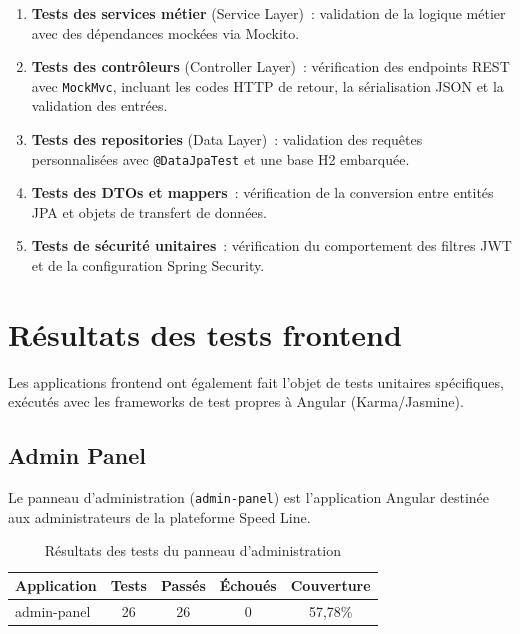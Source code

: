 \begin{enumerate}[leftmargin=*]
  \item \textbf{Tests des services m\'{e}tier} (Service Layer)~: validation de
    la logique m\'{e}tier avec des d\'{e}pendances mock\'{e}es via Mockito.
  \item \textbf{Tests des contr\^{o}leurs} (Controller Layer)~: v\'{e}rification
    des endpoints REST avec \texttt{MockMvc}, incluant les codes HTTP de
    retour, la s\'{e}rialisation JSON et la validation des entr\'{e}es.
  \item \textbf{Tests des repositories} (Data Layer)~: validation des
    requ\^{e}tes personnalis\'{e}es avec \texttt{@DataJpaTest} et une base H2
    embarqu\'{e}e.
  \item \textbf{Tests des DTOs et mappers}~: v\'{e}rification de la conversion
    entre entit\'{e}s JPA et objets de transfert de donn\'{e}es.
  \item \textbf{Tests de s\'{e}curit\'{e} unitaires}~: v\'{e}rification du
    comportement des filtres JWT et de la configuration Spring Security.
\end{enumerate}

\section{R\'{e}sultats des tests frontend}
\label{sec:resultats-frontend}

Les applications frontend ont \'{e}galement fait l'objet de tests unitaires
sp\'{e}cifiques, ex\'{e}cut\'{e}s avec les frameworks de test propres \`{a} Angular
(Karma/Jasmine).

\subsection{Admin Panel}

Le panneau d'administration (\texttt{admin-panel}) est l'application
Angular destin\'{e}e aux administrateurs de la plateforme Speed Line.

\begin{table}[H]
\centering
\caption{R\'{e}sultats des tests du panneau d'administration}
\label{tab:resultats-admin}
\begin{tabularx}{\textwidth}{|X|c|c|c|c|}
\hline
\rowcolor{speedlineBlue!10}
\textbf{Application} & \textbf{Tests} & \textbf{Pass\'{e}s} & \textbf{\'{E}chou\'{e}s} & \textbf{Couverture} \\
\hline
admin-panel & 26 & \textcolor{speedlineGreen}{26} & \textcolor{speedlineGreen}{0} & 57,78\% \\
\hline
\end{tabularx}
\end{table}

